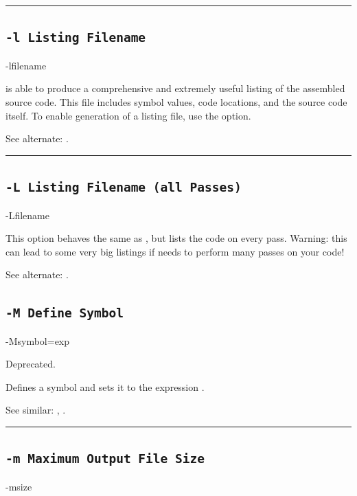\hrule

\subsection{\texttt{-l Listing Filename}}
\label{flag:listing}

\begin{usage}
-lfilename
\end{usage}

\dasm is able to produce a comprehensive and extremely useful listing of the assembled source code. This file includes symbol values, code locations, and the source code itself. To enable generation of a listing file, use the  option.

See alternate: .\\

\hrule
\subsection{\texttt{-L Listing Filename (all Passes)}}
\label{flag:listingall}

\begin{usage}
-Lfilename
\end{usage}

This option behaves the same as , but lists the code on every pass. Warning: this can lead to some very big listings if \dasm needs to perform many passes on your code!

See alternate: .

\subsection{\texttt{-M Define Symbol}}
\label{flag:definesymbolM}
\begin{usage}
-Msymbol=exp
\end{usage}

Deprecated.

Defines a symbol and sets it to the expression \mono{exp]}.

See similar: , .\\

\hrule

\subsection{\texttt{-m Maximum Output File Size}}
\label{flag:maximum}
\begin{usage}
-msize
\end{usage}

